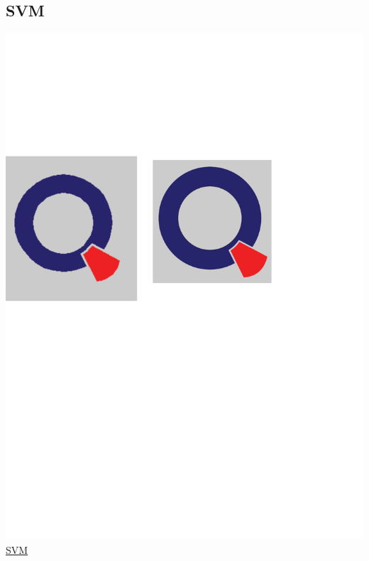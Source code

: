 \documentclass[12pt, a4paper, bibliography=totoc, english]{scrartcl}
\begin{document}
\subsection{SVM}
\includegraphics[scale=0.08]{qletlogo}
\textcolor{blue}{\href{https://github.com/JingyiLiu3136/MLFBM/blob/master/ENS/ENS.R}{SVM}}
\end{document}
